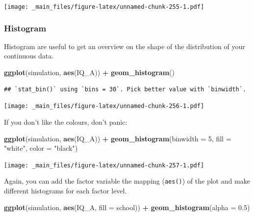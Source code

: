\documentclass[
]{scrartcl}
\newenvironment{Shaded}{\begin{snugshade}}{\end{snugshade}}
\newcommand{\AttributeTok}[1]{\textcolor[rgb]{0.13,0.29,0.53}{#1}}
\newcommand{\DecValTok}[1]{\textcolor[rgb]{0.00,0.00,0.81}{#1}}
\newcommand{\FloatTok}[1]{\textcolor[rgb]{0.00,0.00,0.81}{#1}}
\newcommand{\FunctionTok}[1]{\textcolor[rgb]{0.13,0.29,0.53}{\textbf{#1}}}
\newcommand{\NormalTok}[1]{#1}
\newcommand{\SpecialCharTok}[1]{\textcolor[rgb]{0.81,0.36,0.00}{\textbf{#1}}}
\newcommand{\StringTok}[1]{\textcolor[rgb]{0.31,0.60,0.02}{#1}}
\begin{document}
\texttt{[image: \_main\_files/figure-latex/unnamed-chunk-255-1.pdf]}

\hypertarget{histogram}{%
\subsubsection{Histogram}\label{histogram}}

Histogram are useful to get an overview on the shape of the distribution of your continuous data.

\begin{Shaded}
\begin{Highlighting}[]
\FunctionTok{ggplot}\NormalTok{(simulation, }\FunctionTok{aes}\NormalTok{(IQ\_A)) }\SpecialCharTok{+}
        \FunctionTok{geom\_histogram}\NormalTok{()}
\end{Highlighting}
\end{Shaded}

\begin{verbatim}
## `stat_bin()` using `bins = 30`. Pick better value with `binwidth`.
\end{verbatim}

\texttt{[image: \_main\_files/figure-latex/unnamed-chunk-256-1.pdf]}

If you don't like the colours, don't panic:

\begin{Shaded}
\begin{Highlighting}[]
\FunctionTok{ggplot}\NormalTok{(simulation, }\FunctionTok{aes}\NormalTok{(IQ\_A)) }\SpecialCharTok{+}
    \FunctionTok{geom\_histogram}\NormalTok{(}\AttributeTok{binwidth =} \DecValTok{5}\NormalTok{, }\AttributeTok{fill =} \StringTok{"white"}\NormalTok{, }\AttributeTok{color =} \StringTok{"black"}\NormalTok{)}
\end{Highlighting}
\end{Shaded}

\texttt{[image: \_main\_files/figure-latex/unnamed-chunk-257-1.pdf]}

Again, you can add the factor variable the mapping (\texttt{aes()}) of the plot and make different histograms for each factor level.

\begin{Shaded}
\begin{Highlighting}[]
\FunctionTok{ggplot}\NormalTok{(simulation, }\FunctionTok{aes}\NormalTok{(IQ\_A, }\AttributeTok{fill =}\NormalTok{ school)) }\SpecialCharTok{+}
      \FunctionTok{geom\_histogram}\NormalTok{(}\AttributeTok{alpha =} \FloatTok{0.5}\NormalTok{)}
\end{Highlighting}
\end{Shaded}
\end{document}
